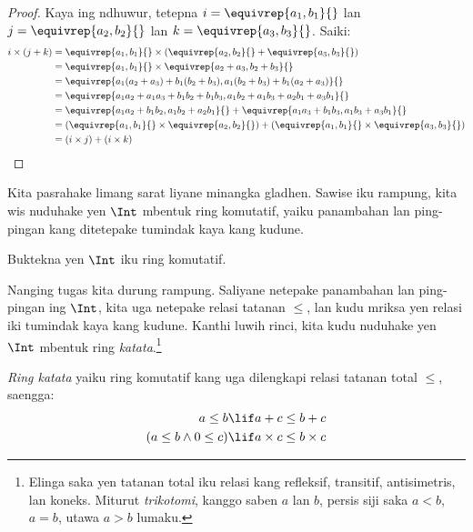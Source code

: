 \documentclass[../../../include/open-logic-section]{subfiles}
\begin{document}
\begin{proof}
Kaya ing ndhuwur, tetepna $i = \equivrep{a_1, b_1}{}$ lan $j =
\equivrep{a_2,b_2}{}$ lan $k = \equivrep{a_3, b_3}{}$. Saiki:
\begin{align*}
	i \times (j + k)
	&= \equivrep{a_1, b_1}{} \times (\equivrep{a_2,b_2}{} + \equivrep{a_3, b_3}{})\\
	&= \equivrep{a_1, b_1}{} \times \equivrep{a_2 + a_3,b_2+b_3}{}\\
	&= \equivrep{a_1  (a_2 + a_3) + b_1  (b_2+b_3), a_1  (b_2 + b_3) + b_1 (a_2 + a_3)}{}\\
	&= \equivrep{a_1 a_2 + a_1a_3 + b_1 b_2+b_1b_3, a_1 b_2 + a_1b_3 + a_2b_1 + a_3b_1}{}\\
	&= \equivrep{a_1a_2 + b_1b_2, a_1b_2 + a_2b_1}{} + \equivrep{a_1a_3 + b_1b_3, a_1b_3 + a_3b_1}{}\\
	&= (\equivrep{a_1, b_1}{} \times \equivrep{a_2,b_2}{}) + (\equivrep{a_1, b_1}{} \times  \equivrep{a_3, b_3}{})\\
	&= (i \times j) + (i \times k)
\end{align*}
\end{proof}

Kita pasrahake limang sarat liyane minangka gladhen. Sawise iku rampung,
kita wis nuduhake yen $\Int$ mbentuk ring komutatif, yaiku panambahan lan
ping-pingan kang ditetepake tumindak kaya kang kudune.

\begin{prob}
Buktekna yen $\Int$ iku ring komutatif.
\end{prob}

Nanging tugas kita durung rampung. Saliyane netepake panambahan lan
ping-pingan ing $\Int$, kita uga netepake relasi tatanan $\leq$, lan kudu
mriksa yen relasi iki tumindak kaya kang kudune. Kanthi luwih rinci, kita
kudu nuduhake yen $\Int$ mbentuk ring \emph{katata}.\footnote{Elinga saka
	 yen tatanan total iku relasi kang
	refleksif, transitif, antisimetris, lan koneks. Miturut \emph{trikotomi}, kanggo saben $a$ lan $b$, persis siji saka
	$a<b$, $a=b$, utawa $a>b$ lumaku.}

\begin{defn}
\emph{Ring katata} yaiku ring komutatif kang uga dilengkapi relasi
tatanan total $\leq$, saengga:
\begin{align*}
	a \leq b &\lif a + c \leq b + c\\
	(a \leq b \land 0 \leq c) &\lif a \times c \leq b \times c
\end{align*}
\end{defn}
\end{document}
